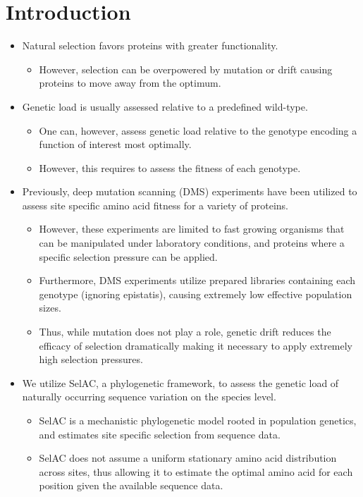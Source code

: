 \documentclass[12pt]{article}
\begin{document}
\section*{Introduction}
\begin{itemize}
	\item Natural selection favors proteins with greater functionality.
	\begin{itemize}
		\item However, selection can be overpowered by mutation or drift causing proteins to move away from the optimum.
	\end{itemize}
	\item Genetic load is usually assessed relative to a predefined wild-type.
	\begin{itemize}
		\item One can, however, assess genetic load relative to the genotype encoding a function of interest most optimally.
		\item However, this requires to assess the fitness of each genotype. 
	\end{itemize}
	\item Previously, deep mutation scanning (DMS) experiments have been utilized to assess site specific amino acid fitness for a variety of proteins.
	\begin{itemize}
		\item However, these experiments are limited to fast growing organisms that can be manipulated under laboratory conditions, and proteins where a specific selection pressure can be applied.
		\item Furthermore, DMS experiments utilize prepared libraries containing each genotype (ignoring epistatis), causing extremely low effective population sizes. 
		\item Thus, while mutation does not play a role, genetic drift reduces the efficacy of selection dramatically making it necessary to apply extremely high selection pressures. 
	\end{itemize}
	\item We utilize SelAC, a phylogenetic framework, to assess the genetic load of naturally occurring sequence variation on the species level.
	\begin{itemize}
		\item SelAC is a mechanistic phylogenetic model rooted in population genetics, and estimates site specific selection from sequence data.
		\item SelAC does not assume a uniform stationary amino acid distribution across sites, thus allowing it to estimate the optimal amino acid for each position given the available sequence data.

\end{itemize}
\end{itemize}
\end{document}
